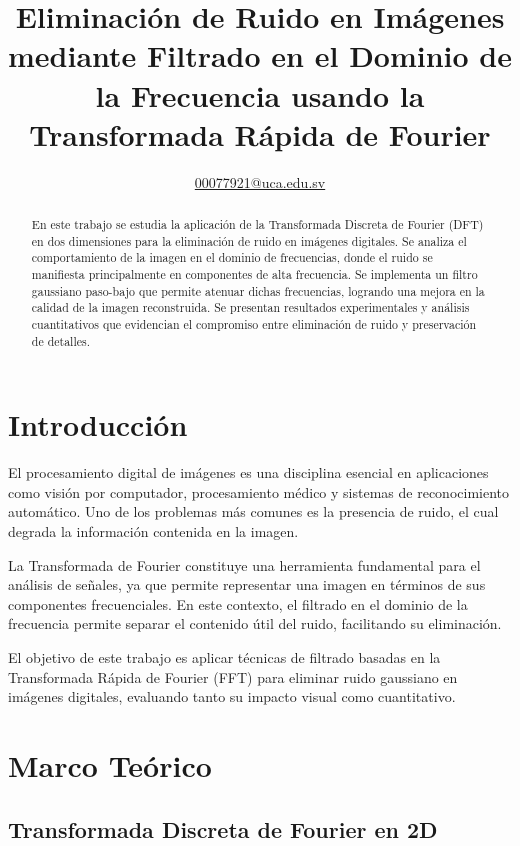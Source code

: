 \documentclass[conference]{IEEEtran}
\title{Eliminación de Ruido en Imágenes mediante Filtrado en el Dominio de la Frecuencia usando la Transformada Rápida de Fourier}
\author{
	\IEEEauthorblockN{Brandon Ascencio, Gabriel Cortez, Xavier Morán y Mario Umaña}
	\IEEEauthorblockA{
		Universidad Centroamericana ``José Simeón Cañas''\\
		Departamento de Matemática\\
	}
		\href{mailto:00077921@uca.edu.sv}{00077921@uca.edu.sv}
}
\begin{document}
	
	\maketitle
	
	\begin{abstract}
		En este trabajo se estudia la aplicación de la Transformada Discreta de Fourier (DFT) en dos dimensiones para la eliminación de ruido en imágenes digitales. Se analiza el comportamiento de la imagen en el dominio de frecuencias, donde el ruido se manifiesta principalmente en componentes de alta frecuencia. Se implementa un filtro gaussiano paso-bajo que permite atenuar dichas frecuencias, logrando una mejora en la calidad de la imagen reconstruida. Se presentan resultados experimentales y análisis cuantitativos que evidencian el compromiso entre eliminación de ruido y preservación de detalles.
	\end{abstract}
	
	\section{Introducción}
	
	El procesamiento digital de imágenes es una disciplina esencial en aplicaciones como visión por computador, procesamiento médico y sistemas de reconocimiento automático. Uno de los problemas más comunes es la presencia de ruido, el cual degrada la información contenida en la imagen.
	
	La Transformada de Fourier constituye una herramienta fundamental para el análisis de señales, ya que permite representar una imagen en términos de sus componentes frecuenciales. En este contexto, el filtrado en el dominio de la frecuencia permite separar el contenido útil del ruido, facilitando su eliminación.
	
	El objetivo de este trabajo es aplicar técnicas de filtrado basadas en la Transformada Rápida de Fourier (FFT) para eliminar ruido gaussiano en imágenes digitales, evaluando tanto su impacto visual como cuantitativo.
	
	\section{Marco Teórico}
	
	\subsection{Transformada Discreta de Fourier en 2D}
	
\end{document}
